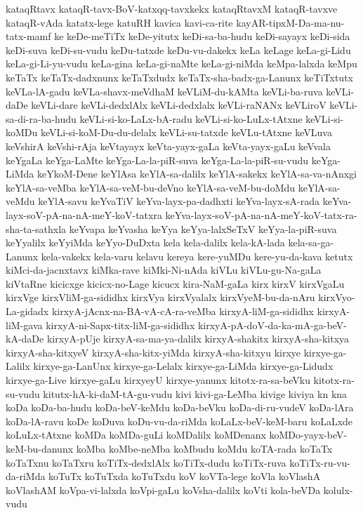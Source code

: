 {kataqRtavx
kataqR-tavx-BoV-katxqq-tavxkekx
kataqRtavxM
kataqR-tavxve
kataqR-vAda
katatx-lege
katuRH
kavica
kavi-ca-rite
kayAR-tipxM-Da-ma-nu-tatx-mamf
ke
keDe-meTiTx
keDe-yitutx
keDi-sa-ba-hudu
keDi-sayayx
keDi-sida
keDi-suva
keDi-su-vudu
keDu-tatxde
keDu-vu-dakekx
keLa
keLage
keLa-gi-Lidu
keLa-gi-Li-yu-vudu
keLa-gina
keLa-gi-naMte
keLa-gi-niMda
keMpa-lalxda
keMpu
keTaTx
keTaTx-dadxnunx
keTaTxdudx
keTaTx-sha-badx-ga-Lanunx
keTiTxtutx
keVLa-lA-gadu
keVLa-shavx-meVdhaM
keVLiM-du-kAMta
keVLi-ba-ruva
keVLi-daDe
keVLi-dare
keVLi-dedxlAlx
keVLi-dedxlalx
keVLi-raNANx
keVLiroV
keVLi-sa-di-ra-ba-hudu
keVLi-si-ko-LaLx-bA-radu
keVLi-si-ko-LuLx-tAtxne
keVLi-si-koMDu
keVLi-si-koM-Du-du-delalx
keVLi-su-tatxde
keVLu-tAtxne
keVLuva
keVshirA
keVshi-rAja
keVtayayx
keVta-yayx-gaLa
keVta-yayx-gaLu
keVvala
keYgaLa
keYga-LaMte
keYga-La-la-piR-suva
keYga-La-la-piR-su-vudu
keYga-LiMda
keYkoM-Dene
keYlAsa
keYlA-sa-dalilx
keYlA-sakekx
keYlA-sa-va-nAnxgi
keYlA-sa-veMba
keYlA-sa-veM-bu-deVno
keYlA-sa-veM-bu-doMdu
keYlA-sa-veMdu
keYlA-savu
keYvaTiV
keYva-layx-pa-dadhxti
keYva-layx-sA-rada
keYva-layx-soV-pA-na-nA-meY-koV-tatxra
keYva-layx-soV-pA-na-nA-meY-koV-tatx-ra-sha-ta-sathxla
keYvapa
keYvasha
keYya
keYya-lalxSeTxV
keYya-la-piR-suva
keYyalilx
keYyiMda
keYyo-DuDxta
kela
kela-dalilx
kela-kA-lada
kela-sa-ga-Lanunx
kela-vakekx
kela-varu
kelavu
kereya
kere-yuMDu
kere-yu-da-kava
ketutx
kiMci-da-jacnxtavx
kiMka-rave
kiMki-Ni-nAda
kiVLu
kiVLu-gu-Na-gaLa
kiVtaRne
kicicxge
kicicx-no-Lage
kicucx
kira-NaM-gaLa
kirx
kirxV
kirxVgaLu
kirxVge
kirxVliM-ga-sididhx
kirxVya
kirxVyalalx
kirxVyeM-bu-da-nAru
kirxVyo-La-gidadx
kirxyA-jAcnx-na-BA-vA-cA-ra-veMba
kirxyA-liM-ga-sididhx
kirxyA-liM-gava
kirxyA-ni-Sapx-titx-liM-ga-sididhx
kirxyA-pA-doV-da-ka-mA-ga-beV-kA-daDe
kirxyA-pUje
kirxyA-sa-ma-ya-dalilx
kirxyA-shakitx
kirxyA-sha-kitxya
kirxyA-sha-kitxyeV
kirxyA-sha-kitx-yiMda
kirxyA-sha-kitxyu
kirxye
kirxye-ga-Lalilx
kirxye-ga-LanUnx
kirxye-ga-Lelalx
kirxye-ga-LiMda
kirxye-ga-Lidudx
kirxye-ga-Live
kirxye-gaLu
kirxyeyU
kirxye-yanunx
kitotx-ra-sa-beVku
kitotx-ra-su-vudu
kitutx-hA-ki-daM-tA-gu-vudu
kivi
kivi-ga-LeMba
kivige
kiviya
kn
kna
koDa
koDa-ba-hudu
koDa-beV-keMdu
koDa-beVku
koDa-di-ru-vudeV
koDa-lAra
koDa-lA-ravu
koDe
koDuva
koDu-vu-da-riMda
koLaLx-beV-keM-baru
koLaLxde
koLuLx-tAtxne
koMDa
koMDa-guLi
koMDalilx
koMDenanx
koMDo-yayx-beV-keM-bu-danunx
koMba
koMbe-neMba
koMbudu
koMdu
koTA-rada
koTaTx
koTaTxnu
koTaTxru
koTiTx-dedxlAlx
koTiTx-dudu
koTiTx-ruva
koTiTx-ru-vu-da-riMda
koTuTx
koTuTxda
koTuTxdu
koV
koVTa-lege
koVla
koVlashA
koVlashAM
koVpa-vi-lalxda
koVpi-gaLu
koVsha-dalilx
koVti
kola-beVDa
kolulx-vudu
}

